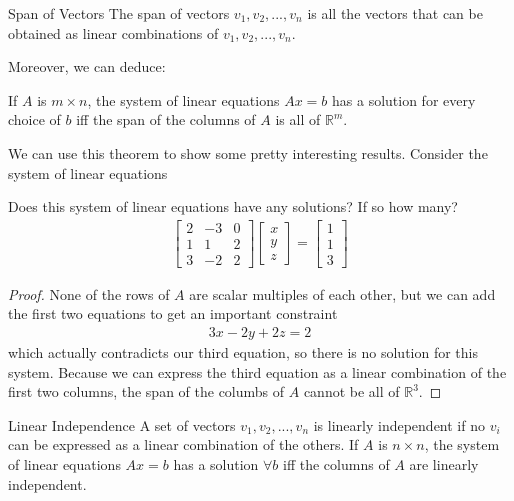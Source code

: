 \documentclass[11pt]{article}
\begin{document}
\begin{definitionbox}{Span of Vectors}
    The span of vectors $v_1,v_2,...,v_n$ is all the vectors that can be obtained as linear combinations of $v_1,v_2,...,v_n$.
\end{definitionbox}
Moreover, we can deduce:
\begin{theorembox}{}
    If $A$ is $m \times n$, the system of linear equations $Ax=b$ has a solution for every choice of $b$ iff the span of the columns of $A$ is all of $\mathbb{R}^m$.
\end{theorembox}
We can use this theorem to show some pretty interesting results. Consider the system of linear equations
\begin{examplebox}{}
    Does this system of linear equations have any solutions? If so how many?
    \begin{align*}
        \begin{bmatrix}
            2 & -3 & 0 \\
            1 & 1 & 2 \\
            3 & -2 & 2
        \end{bmatrix}
        \begin{bmatrix}
            x \\
            y \\
            z 
        \end{bmatrix}
        =
        \begin{bmatrix}
            1 \\
            1 \\
            3
        \end{bmatrix}
    \end{align*}
\end{examplebox}
\begin{proof}
    None of the rows of $A$ are scalar multiples of each other, but we can add the first two equations to get an important constraint
    \begin{align*}
        3x-2y+2z=2
    \end{align*}
    which actually contradicts our third equation, so there is no solution for this system. Because we can express the third equation as a linear combination of the first two columns, the span of the columbs of $A$ cannot be all of $\mathbb{R}^3$.
\end{proof}
\begin{definitionbox}{Linear Independence}
    A set of vectors $v_1,v_2,...,v_n$ is linearly independent if no $v_i$ can be expressed as a linear combination of the others. If $A$ is $n \times n$, the system of linear equations $Ax=b$ has a solution $\forall b$ iff the columns of $A$ are linearly independent.
\end{definitionbox}
\end{document}
